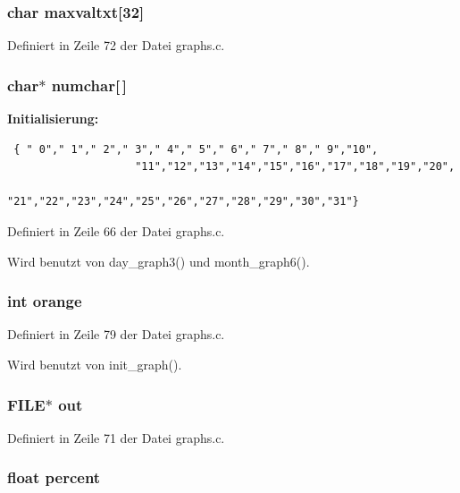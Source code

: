 \subsubsection{\setlength{\rightskip}{0pt plus 5cm}char {\bf maxvaltxt}[32]}\label{graphs_8c_3933b61d12d9878aa33d711259d94c5f}




Definiert in Zeile 72 der Datei graphs.c.
\subsubsection{\setlength{\rightskip}{0pt plus 5cm}char$\ast$ {\bf numchar}[$\,$]}\label{graphs_8c_d8920ceda92347671d37ba01be631d65}


{\bf Initialisierung:}

\footnotesize\begin{verbatim} { " 0"," 1"," 2"," 3"," 4"," 5"," 6"," 7"," 8"," 9","10",
                    "11","12","13","14","15","16","17","18","19","20",
                    "21","22","23","24","25","26","27","28","29","30","31"}
\end{verbatim}\normalsize 


Definiert in Zeile 66 der Datei graphs.c.

Wird benutzt von day\_\-graph3() und month\_\-graph6().
\subsubsection{\setlength{\rightskip}{0pt plus 5cm}int {\bf orange}}\label{graphs_8c_d316f80317cb97c5ada72ac0e05bbf92}




Definiert in Zeile 79 der Datei graphs.c.

Wird benutzt von init\_\-graph().
\subsubsection{\setlength{\rightskip}{0pt plus 5cm}FILE$\ast$ {\bf out}}\label{graphs_8c_1277960b5f2b37137fe9b0b5a1ea0beb}




Definiert in Zeile 71 der Datei graphs.c.
\subsubsection{\setlength{\rightskip}{0pt plus 5cm}float {\bf percent}}\label{graphs_8c_ac167f3972a2f244f4b32c8ee5b89364}




